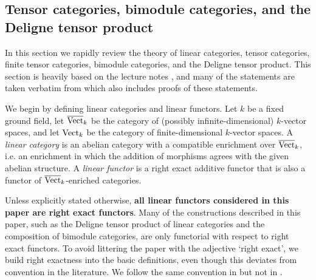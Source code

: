 \documentclass{amsart}
\begin{document}
\subsection{Tensor categories, bimodule categories, and the Deligne tensor product} \label{sec:tc-lincat}

In this section we rapidly review the theory of linear categories, tensor categories, finite tensor categories, bimodule categories, and the Deligne tensor product.  This section is heavily based on the lecture notes \cite{EGNO}, and many of the statements are taken verbatim from \cite{BTP} which also includes proofs of these statements.  

We begin by defining linear categories and linear functors.  Let $k$ be a fixed ground field, let $\overline{\mathrm{Vect}}_k$ be the category of (possibly infinite-dimensional) $k$-vector spaces, and let $\mathrm{Vect}_k$ be the category of finite-dimensional $k$-vector spaces.   A {\em linear category} is an abelian category with a compatible enrichment over $\overline{\mathrm{Vect}}_k$, i.e. an enrichment in which the addition of morphisms agrees with the given abelian structure. A {\em linear functor} is a right exact additive functor that is also a functor of $\overline{\mathrm{Vect}}_k$-enriched categories. 

\begin{warning}
	Unless explicitly stated otherwise, {\bfseries all linear functors considered in this paper are  right exact functors}.  Many of the constructions described in this paper, such as the Deligne tensor product of linear categories and the composition of bimodule categories, are only functorial with respect to right exact functors. To avoid littering the paper with the adjective `right exact', we build right exactness into the basic definitions, even though this deviates from convention in the literature.  We follow the same convention in \cite{3TC} but not in \cite{BTP}.  
\end{warning}
\end{document}
